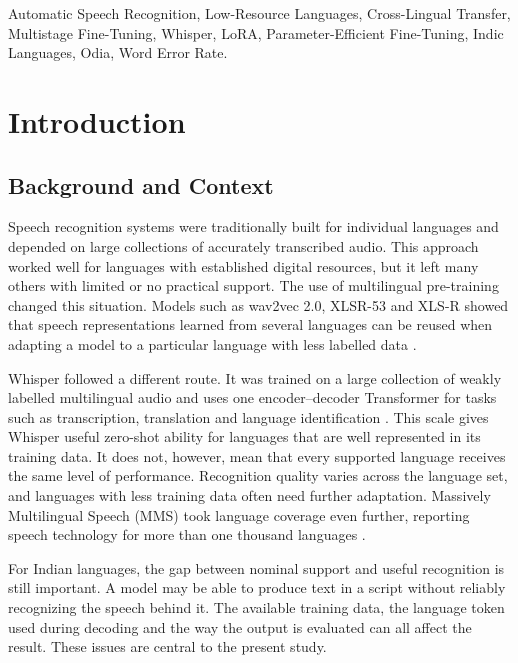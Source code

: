 \documentclass[conference]{IEEEtran}
\begin{document}
\begin{IEEEkeywords}
Automatic Speech Recognition, Low-Resource Languages, Cross-Lingual
Transfer, Multistage Fine-Tuning, Whisper, LoRA, Parameter-Efficient
Fine-Tuning, Indic Languages, Odia, Word Error Rate.
\end{IEEEkeywords}

\section{Introduction}

\subsection{Background and Context}

Speech recognition systems were traditionally built for individual
languages and depended on large collections of accurately transcribed
audio. This approach worked well for languages with established digital
resources, but it left many others with limited or no practical support.
The use of multilingual pre-training changed this situation. Models such
as wav2vec 2.0, XLSR-53 and XLS-R showed that speech representations
learned from several languages can be reused when adapting a model to a
particular language with less labelled data \cite{conneau2021xlsr,babu2022xlsr}.

Whisper followed a different route. It was trained on a large collection
of weakly labelled multilingual audio and uses one encoder--decoder
Transformer for tasks such as transcription, translation and language
identification \cite{radford2023whisper}. This scale gives Whisper useful
zero-shot ability for languages that are well represented in its training
data. It does not, however, mean that every supported language receives
the same level of performance. Recognition quality varies across the
language set, and languages with less training data often need further
adaptation. Massively Multilingual Speech (MMS) took language coverage
even further, reporting speech technology for more than one thousand
languages \cite{pratap2024mms}.

For Indian languages, the gap between nominal support and useful
recognition is still important. A model may be able to produce text in a
script without reliably recognizing the speech behind it. The available
training data, the language token used during decoding and the way the
output is evaluated can all affect the result. These issues are central
to the present study.
\end{document}
